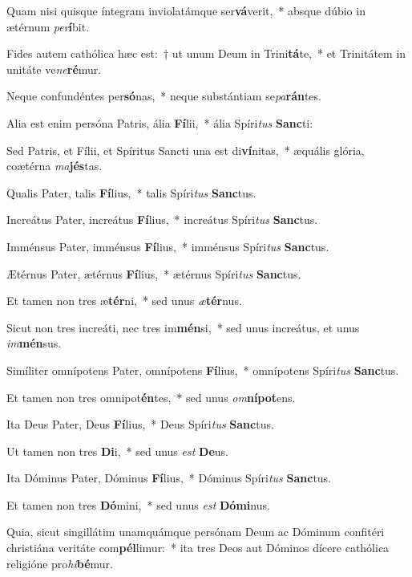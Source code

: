 \item Quam nisi quisque íntegram inviolatámque ser\textbf{vá}verit,~* absque dúbio in ætérnum \textit{per}\textbf{í}bit.
\item Fides autem cathólica hæc est:~† ut unum Deum in Trini\textbf{tá}te,~* et Trinitátem in unitáte ve\textit{ne}\textbf{ré}mur.
\item Neque confundéntes per\textbf{só}nas,~* neque substántiam se\textit{pa}\textbf{rán}tes.
\item Alia est enim persóna Patris, ália \textbf{Fí}lii,~* ália Spíri\textit{tus} \textbf{Sanc}ti:
\item Sed Patris, et Fílii, et Spíritus Sancti una est di\textbf{ví}nitas,~* æquális glória, coætérna \textit{ma}\textbf{jés}tas.
\item Qualis Pater, talis \textbf{Fí}lius,~* talis Spíri\textit{tus} \textbf{Sanc}tus.
\item Increátus Pater, increátus \textbf{Fí}lius,~* increátus Spíri\textit{tus} \textbf{Sanc}tus.
\item Imménsus Pater, imménsus \textbf{Fí}lius,~* imménsus Spíri\textit{tus} \textbf{Sanc}tus.
\item Ætérnus Pater, ætérnus \textbf{Fí}lius,~* ætérnus Spíri\textit{tus} \textbf{Sanc}tus.
\item Et tamen non tres æ\textbf{tér}ni,~* sed unus \textit{æ}\textbf{tér}nus.
\item Sicut non tres increáti, nec tres im\textbf{mén}si,~* sed unus increátus, et unus \textit{im}\textbf{mén}sus.
\item Simíliter omnípotens Pater, omnípotens \textbf{Fí}lius,~* omnípotens Spíri\textit{tus} \textbf{Sanc}tus.
\item Et tamen non tres omnipot\textbf{én}tes,~* sed unus \textit{om}\textbf{ní}\textbf{pot}ens.
\item Ita Deus Pater, Deus \textbf{Fí}lius,~* Deus Spíri\textit{tus} \textbf{Sanc}tus.
\item Ut tamen non tres \textbf{Di}i,~* sed unus \textit{est} \textbf{De}us.
\item Ita Dóminus Pater, Dóminus \textbf{Fí}lius,~* Dóminus Spíri\textit{tus} \textbf{Sanc}tus.
\item Et tamen non tres \textbf{Dó}mini,~* sed unus \textit{est} \textbf{Dó}\textbf{mi}nus.
\item Quia, sicut singillátim unamquámque persónam Deum ac Dóminum confitéri christiána veritáte com\textbf{pél}limur:~* ita tres Deos aut Dóminos dícere cathólica religióne pro\textit{hi}\textbf{bé}mur.
